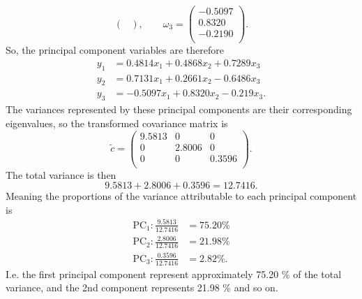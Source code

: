 \begin{derivation}
\begin{enumerate}[label=\alph*)]
\begin{equation*}
\begin{pmatrix}
          \end{pmatrix}, \qquad \omega_3 = \begin{pmatrix}
            \num{-0,5097} \\
          \num{0,8320} \\
          \num{-0,2190} \\
          \end{pmatrix}
        .\end{equation*}
        So, the principal component variables are therefore
        \begin{align*}
          y_1 &= \num{0,4814} x_1 + \num{0,4868} x_2 + \num{0,7289} x_3\\
          y_2 &= \num{0,7131} x_1 + \num{0,2661} x_2 - \num{0,6486} x_3 \\
          y_3 &= \num{-0,5097} x_1 + \num{0,8320} x_2 - \num{0,219} x_3
        .\end{align*}
        The variances represented by these principal components are their corresponding eigenvalues, so the transformed covariance matrix is
        \begin{equation*}
          \tilde{c} = \begin{pmatrix}
            \num{9,5813}  & 0 & 0\\
          0 & \num{2,8006}  & 0\\
          0 & 0 & \num{0,3596} \\
          \end{pmatrix}
        .\end{equation*}
        The total variance is then
        \begin{equation*}
          \num{9,5813}  + \num{2,8006}  + \num{0,3596}  = \num{12,7416} 
        .\end{equation*}
        Meaning the proportions of the variance attributable to each principal component is
        \begin{align*}
          \text{PC}_1 : \frac{\num{9,5813}}{\num{12,7416} } &= \num{75,20} \% \\
          \text{PC}_2 : \frac{\num{2,8006}}{\num{12,7416}} &= \num{21,98} \% \\
          \text{PC}_3 : \frac{\num{0,3596}}{\num{12,7416}} &= \num{2,82} \%
        .\end{align*}
        I.e. the first principal component represent approximately \num{75,20} \% of the total variance, and the 2nd component represents \num{21,98} \% and so on.
      \end{enumerate}
    \end{derivation}  

